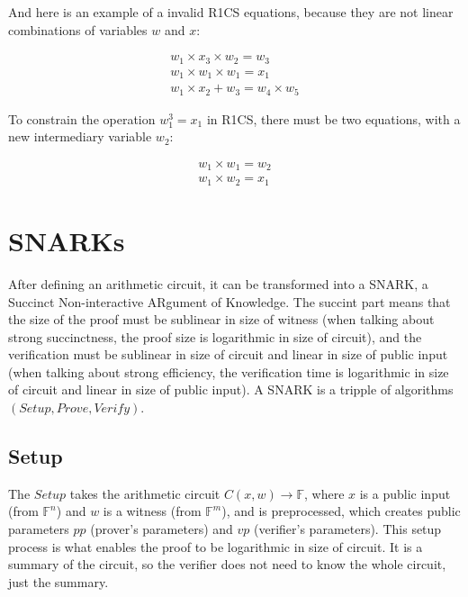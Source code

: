 And here is an example of a invalid R1CS equations, because they are not linear
combinations of variables $w$ and $x$:

\begin{displaymath}
    \begin{array}{l}
        w_1 \times x_3 \times w_2 = w_3 \\
        w_1 \times w_1 \times w_1 = x_1 \\
        w_1 \times x_2 + w_3 = w_4 \times w_5
    \end{array}
\end{displaymath}

To constrain the operation $w_1^3 = x_1$ in R1CS, there must be two equations, with
a new intermediary variable $w_2$:

\begin{displaymath}
    \begin{array}{l}
        w_1 \times w_1 = w_2 \\
        w_1 \times w_2 = x_1
    \end{array}
\end{displaymath}

\section{SNARKs}

After defining an arithmetic circuit, it can be transformed into a SNARK,
a Succinct Non-interactive ARgument of Knowledge. The succint part means that
the size of the proof must be sublinear in size of witness (when talking about
strong succinctness, the proof size is logarithmic in size of circuit), and
the verification must be sublinear in size of circuit and linear in size of
public input (when talking about strong efficiency, the verification time is
logarithmic in size of circuit and linear in size of public input).
A SNARK is a tripple of algorithms $(Setup, Prove, Verify)$.

\subsection{Setup}

The $Setup$ takes
the arithmetic circuit $C(x, w) \rightarrow \mathbb{F}$, where $x$ is a public
input (from $\mathbb{F}^n$) and $w$ is a witness (from $\mathbb{F}^m$), and
is preprocessed, which creates public parameters $pp$ (prover's parameters)
and $vp$ (verifier's parameters). This setup process is what enables the
proof to be logarithmic in size of circuit. It is a summary of the circuit,
so the verifier does not need to know the whole circuit, just the summary.

